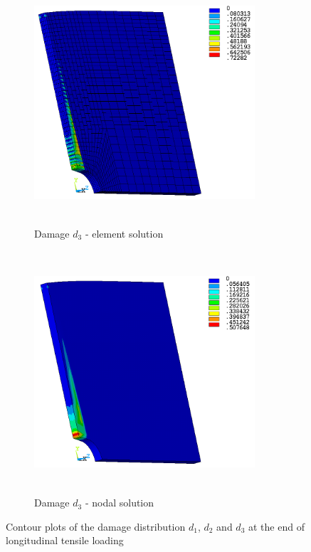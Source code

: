 \documentclass[12pt,a4paper,twoside,openright]{report}
\begin{document}
\begin{figure}[htbp!]\ContinuedFloat     
     \begin{subfigure}[b]{0.4\textwidth}
         \includegraphics[width=8.2cm,height=9cm]{27.d3-lt-e.png}
         \caption{Damage $d_{3}$ - element solution}
         \label{fig:d3-lt-e}
     \end{subfigure}
     \hspace{1.9cm}
     \begin{subfigure}[b]{0.4\textwidth}
         \includegraphics[width=8.2cm,height=9cm]{27.d3-lt-n.png}
         \caption{Damage $d_{3}$ - nodal solution}
         \label{fig:d3-lt-n}
     \end{subfigure}
        \caption{Contour plots of the damage distribution $d_{1}$, $d_{2}$ and $d_{3}$ at the end of longitudinal tensile loading }
        \label{fig:Contour plots of the damage d1,d2,d3}     
\end{figure}
\FloatBarrier
\end{document}
